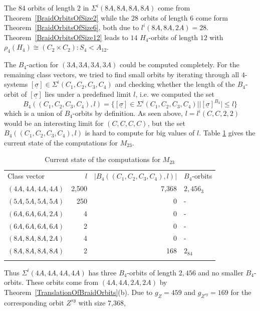\documentclass[12pt,a4paper]{article}
\numberwithin{equation}{section}
\numberwithin{table}{section}
\begin{document}
%
\par
\noindent
The $84$ orbits of length $2$ in $\Sigma^i(8A,8A,8A,8A)$ come from Theorem~\ref{BraidOrbitsOfSize2} while the $28$
orbits of length $6$ come form Theorem~\ref{BraidOrbitsOfSize6}, both due to $l^i(8A,8A,2A)=28$.
Theorem~\ref{BraidOrbitsOfSize12} leads to $14$ $H_4$-orbits of length $12$ with
$\rho_4(H_4) \cong (C_2 \times C_2):S_4 < A_{12}$.
\par
\noindent
The $B_4$-action for $(3A,3A,3A,3A)$ could be computed completely. For the remaining class vectors,
we tried to find small orbits by iterating through all $4$-systems 
$[\underline{\sigma}] \in \Sigma^i(C_1,C_2,C_3,C_4)$ and checking whether the length of the $B_4$-orbit 
of $[\underline{\sigma}]$ lies under a predefined limit $l$, i.e. we computed the set 
$$B_4((C_1,C_2,C_3,C_4),l) = 
\{ [\underline{\sigma}] \in \Sigma^i(C_1,C_2,C_3,C_4) \mid \vert [\underline{\sigma}]^{B_4} \vert \leq l \}$$
which is a union of $B_4$-orbits by definition. As seen above, $l=l^i(C,C,2,2)$ would be an interesting limit
for $(C,C,C,C)$, but the set $B_4((C_1,C_2,C_3,C_4),l)$ is hard to compute for big values of $l$.
Table \ref{tab:CurrentStateOfComputations} gives the current state of the computations for $M_{23}$.
%
\begin{table}[!htbp]
\centering
\footnotesize
\captionsetup{font=footnotesize}
\caption{Current state of the computations for $M_{23}$}
\label{tab:CurrentStateOfComputations}
\begin{tabular}{lrrl}
\hline\noalign{\smallskip}
Class vector & $l$ & $ \vert B_4((C_1,C_2,C_3,C_4),l) \vert $ & $B_4$-orbits \\
\noalign{\smallskip}\hline\noalign{\smallskip}
$(4A,4A,4A,4A)$ & 2,500 & 7,368 & $2,456_3$ \\
$(5A,5A,5A,5A)$ & 250 & 0 & - \\
$(6A,6A,6A,2A)$ & 4 & 0 & - \\
$(6A,6A,6A,6A)$ & 2 & 0 & - \\
$(8A,8A,8A,2A)$ & 4 & 0 & - \\
$(8A,8A,8A,8A)$ & 2 & 168 & $2_{84}$ \\
\noalign{\smallskip}\hline
\end{tabular}
\end{table}
%
\par
\noindent
Thus $\Sigma^i(4A,4A,4A,4A)$ has three $B_4$-orbits of length $2,456$ and no smaller $B_4$-orbits.
These orbits come from $(4A,4A,2A,2A)$ by Theorem~\ref{TranslationOfBraidOrbits}(b).
Due to $g_Z=459$ and $g_{Z^{sy}}=169$ for the corresponding orbit $Z^{sy}$ with size 7,368,
\end{document}
